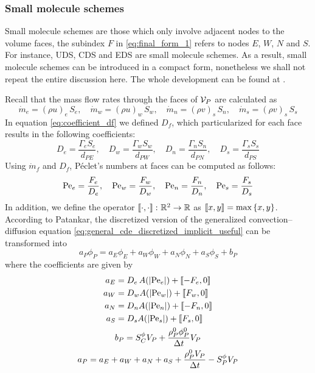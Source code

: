 
\subsubsection{Small molecule schemes}

Small molecule schemes are those which only involve adjacent nodes to the volume
faces, \ie the subindex $F$ in \eqref{eq:final_form_1} refers to nodes $E$, $W$,
$N$ and $S$. For instance, UDS, CDS and EDS are small molecule schemes. As a
result, small molecule schemes can be introduced in a compact form, nonetheless
we shall not repeat the entire discussion here. The whole development can be
found at \cite{patankar2008numerical}. 

Recall that the mass flow rates through the faces of $\mathcal{V}_{P}$ are calculated
as
\begin{equation*}
	\dot{m}_e = (\rho u)_e \, S_e, \quad
	\dot{m}_w = (\rho u)_w \, S_w, \quad
	\dot{m}_n = (\rho v)_s \, S_n, \quad
	\dot{m}_s = (\rho v)_s \, S_s
\end{equation*}
In equation \eqref{eq:coefficient_df} we defined $D_f$, which particularized for
each face results in the following coefficients:
\begin{equation*}
	D_e = \frac{\Gamma_e S_e}{d_{PE}}, \quad
	D_w = \frac{\Gamma_w S_w}{d_{PW}}, \quad
	D_n = \frac{\Gamma_n S_n}{d_{PN}}, \quad
	D_s = \frac{\Gamma_s S_s}{d_{PS}}
\end{equation*}
Using $\dot{m}_f$ and $D_f$, Péclet's numbers at faces can be computed as follows:
\begin{equation*}
	\mathrm{Pe}_e = \frac{F_e}{D_e}, \quad
	\mathrm{Pe}_w = \frac{F_w}{D_w}, \quad
	\mathrm{Pe}_n = \frac{F_n}{D_n}, \quad
	\mathrm{Pe}_s = \frac{F_s}{D_s}
\end{equation*}
In addition, we define the operator $\left\llbracket \cdot, \cdot \right\rrbracket \colon \mathbb{R}^2 \to
\mathbb{R}$ as $\left\llbracket x, y \right\rrbracket = \max{\{x, y\}}$. According to Patankar, the discretized
version of the generalized convection--diffusion equation
\eqref{eq:general_cde_discretized_implicit_useful} can be transformed into
\begin{equation} \label{eq:small_molecule_schemes}
	a_P \phi_P = a_E \phi_E + a_W \phi_W + a_N \phi_N + a_S \phi_S + b_P
\end{equation}
where the coefficients are given by
\begin{gather}
	\begin{align}
		a_E &= D_e \, A(\abs{\mathrm{Pe}_e}) + \left\llbracket -F_e, 0 \right\rrbracket 	\\
		a_W &= D_w A(\abs{\mathrm{Pe}_w}) + \left\llbracket F_w, 0 \right\rrbracket 	\\
		a_N &= D_n A(\abs{\mathrm{Pe}_n}) + \left\llbracket -F_n, 0 \right\rrbracket	\\
		a_S &= D_s A(\abs{\mathrm{Pe}_s}) + \left\llbracket F_s, 0 \right\rrbracket
	\end{align} \\
	b_P = S_C^\phi V_P + \frac{\rho_P^0 \phi_P^0}{\Delta t} V_P \\
	a_P = a_E + a_W + a_N + a_S + \frac{\rho_P^0 V_P}{\Delta t} - S_P^\phi V_P \label{eq:small_molecule_ap}
\end{gather}

